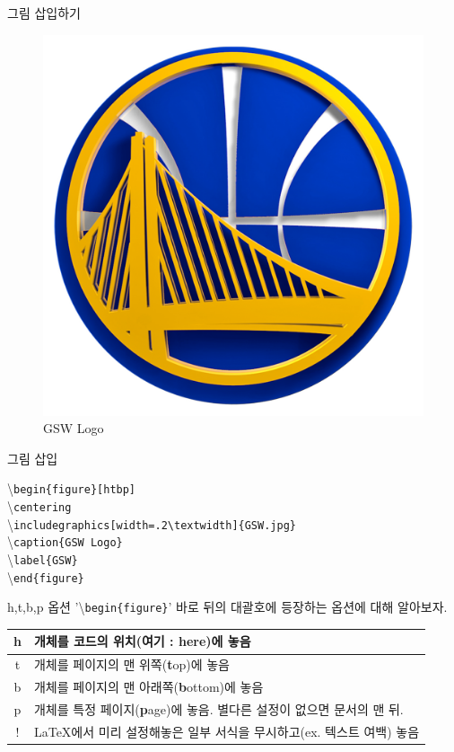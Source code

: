 \documentclass[12pt]{gshs_lecture}
\newenvironment{codeblock}[1]{
	\begin{block}{#1}
		\setstretch{1.0}
		\begin{small}
}{
		\end{small}
	\end{block}
}
\begin{document}
\begin{frame}[t]{그림 삽입하기}
	
	\begin{figure}[htbp]
		\centering
		\includegraphics[width=.2\textwidth]{./pictures/GSW_logo.jpg}
		\caption{GSW Logo}
		\label{GSW}
	\end{figure}
	
	\begin{codeblock}{그림 삽입}
		\textbackslash \texttt{begin\{figure\}[htbp]}\\
		\hspace{6mm} \textbackslash \texttt{centering}\\
		\hspace{6mm} \textbackslash \texttt{includegraphics[width=.2\textbackslash textwidth]\{GSW.jpg\}}\\
		\hspace{6mm} \textbackslash \texttt{caption\{GSW Logo\}}\\
		\hspace{6mm} \textbackslash \texttt{label\{GSW\}}\\
		\textbackslash \texttt{end\{figure\}}
	\end{codeblock}
\end{frame}

\begin{frame}[t]{h,t,b,p 옵션}
	'\textbackslash \texttt{begin\{figure\}}' 바로 뒤의 대괄호에 등장하는 옵션에 대해 알아보자.
	\begin{table}
		\centering
		\begin{tabular}{|c|p{}|}
			\hline
			h & 개체를 코드의 위치(여기 : \textbf{h}ere)에 놓음 \\
			\hline
			t & 개체를 페이지의 맨 위쪽(\textbf{t}op)에 놓음 \\
			\hline
			b & 개체를 페이지의 맨 아래쪽(\textbf{b}ottom)에 놓음 \\
			\hline
			p & 개체를 특정 페이지(\textbf{p}age)에 놓음. 별다른 설정이 없으면 문서의 맨 뒤. \\
			\hline
			! & \LaTeX 에서 미리 설정해놓은 일부 서식을 무시하고(ex. 텍스트 여백) 놓음\\
			\hline
		\end{tabular}
	\end{table}
\end{frame}
\end{document}
